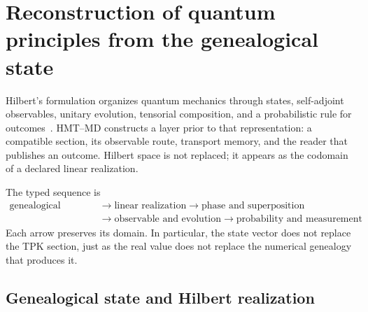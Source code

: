 
\section{Reconstruction of quantum principles from the genealogical state}
\label{sec:postulados-cuanticos-genealogicos-rev2}

Hilbert's formulation organizes quantum mechanics through states,
self-adjoint observables, unitary evolution, tensorial composition, and a
probabilistic rule for outcomes~\cite{vonNeumann1932}. HMT--MD
constructs a layer prior to that representation: a compatible section,
its observable route, transport memory, and the reader that publishes an
outcome. Hilbert space is not replaced; it appears as the codomain of
a declared linear realization.

The typed sequence is
\[
 \boxed{\begin{aligned}
 \text{genealogical section}
 &\longrightarrow \text{linear realization}
 \longrightarrow \text{phase and superposition}\\
 &\longrightarrow \text{observable and evolution}
 \longrightarrow \text{probability and measurement}
 \end{aligned}}
\]
Each arrow preserves its domain. In particular, the state vector does not
replace the TPK section, just as the real value does not replace
the numerical genealogy that produces it.

\subsection{Genealogical state and Hilbert realization}

